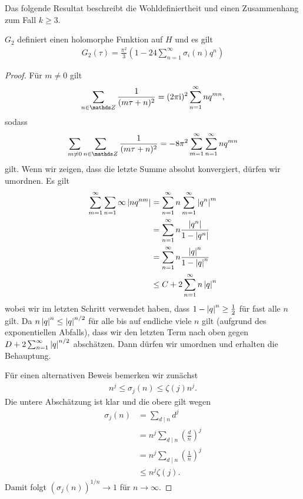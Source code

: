 Das folgende Resultat beschreibt die Wohldefiniertheit und einen Zusammenhang zum Fall $k\geq 3$.
\begin{prop}
$G_2$ definiert einen holomorphe Funktion auf $H$ und es gilt
\begin{align*}
G_2(\tau)=\frac{\pi^2}{3}(1-24\sum_{n=1}^\infty \sigma_i(n)q^n)
\end{align*}
\end{prop}
\begin{proof}
Für $m\not =0$ gilt
\begin{align*}
\sum_{n \in \Z} \frac{1}{(m\tau+n)^2} =(2\pi \mathrm{i})^2 \sum_{n=1}^\infty nq^{mn},
\end{align*}
sodass
\begin{align*}
\sum_{m\not =0} \sum_{n \in \Z} \frac{1}{(m \tau+n)^2}=-8\pi^2 \sum_{m=1}^\infty \sum_{n=1}^\infty n q^{mn}
\end{align*}
gilt.
Wenn wir zeigen, dass die letzte Summe absolut konvergiert, dürfen wir umordnen.
Es gilt
\begin{align*}
\sum_{m=1}^\infty \sum_{n=1}\infty \left\vert nq^{nm}\right\vert &= \sum_{n=1}^\infty n \sum_{m=1}^\infty \left\vert q^n\right\vert^m\\
&=\sum_{n=1}^\infty n \frac{\left\vert q^n\right\vert}{1-\left\vert q^n\right\vert}\\
&=\sum_{n=1}^\infty n \frac{\left\vert q\right\vert^n}{1-\left\vert q\right\vert^n}\\
&\leq C+2\sum_{n=1}^\infty n \left\vert q\right\vert^n
\end{align*}
wobei wir im letzten Schritt verwendet haben, dass $1-\left\vert q\right\vert^n \geq \frac{1}{2}$ für fast alle $n$ gilt.
Da $n \left\vert q\right\vert^n \leq \left\vert q\right\vert^{n/2}$ für alle bis auf endliche viele $n$ gilt (aufgrund des exponentiellen Abfalls), dass wir den letzten Term nach oben gegen $D+2\sum_{n=1}^\infty \left\vert q\right\vert^{n/2}$ abschätzen.
Dann dürfen wir umordnen und erhalten die Behauptung.

Für einen alternativen Beweis bemerken wir zunächst
\begin{align*}
n^j \leq \sigma_j(n)\leq \zeta(j)n^j.
\end{align*}
Die untere Abschätzung ist klar und die obere gilt wegen
\begin{align*}
\sigma_j(n)&=\sum_{d\mid n} d^j \\
&=n^j \sum_{d\mid n} \left(\frac{d}{n}\right)^j\\
&=n^j \sum_{d\mid n} \left(\frac{1}{n}\right)^j\\
&\leq n^j \zeta(j).
\end{align*}
Damit folgt $(\sigma_j(n))^{1/n} \to 1$ für $n \to \infty$.
\end{proof}

